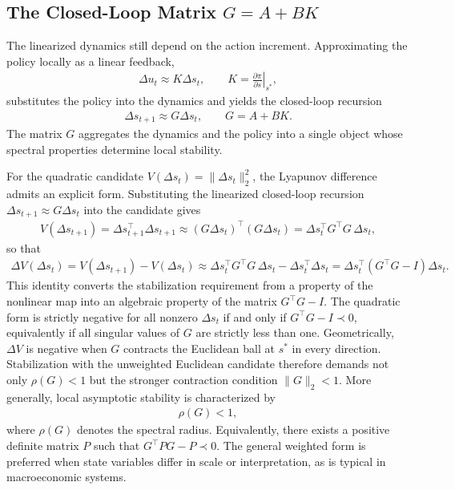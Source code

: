 \documentclass[11pt]{article}
\begin{document}
\subsection{The Closed-Loop Matrix $G=A+BK$}
The linearized dynamics still depend on the action increment. Approximating the policy locally as a linear feedback,
\begin{align*}
    \Delta u_t \approx K \Delta s_t,
    \qquad
    K = \left.\frac{\partial \pi}{\partial s}\right|_{s^*},
\end{align*}
substitutes the policy into the dynamics and yields the closed-loop recursion
\begin{align}
    \Delta s_{t+1} \approx G\Delta s_t,
    \qquad
    G = A + BK.
\end{align}
The matrix $G$ aggregates the dynamics and the policy into a single object whose spectral properties determine local stability.

For the quadratic candidate $V(\Delta s_t)=\|\Delta s_t\|_2^2$, the Lyapunov difference admits an explicit form. Substituting the linearized closed-loop recursion $\Delta s_{t+1} \approx G\Delta s_t$ into the candidate gives
\begin{align*}
    V(\Delta s_{t+1}) = \Delta s_{t+1}^\top \Delta s_{t+1}
    \approx (G\Delta s_t)^\top (G\Delta s_t) = \Delta s_t^\top G^\top G\, \Delta s_t,
\end{align*}
so that
\begin{align}
    \Delta V(\Delta s_t)
    = V(\Delta s_{t+1}) - V(\Delta s_t)
    \approx \Delta s_t^\top G^\top G\, \Delta s_t - \Delta s_t^\top \Delta s_t
    = \Delta s_t^\top (G^\top G - I)\Delta s_t.
    \label{eq:dV-quadratic}
\end{align}
This identity converts the stabilization requirement from a property of the nonlinear map into an algebraic property of the matrix $G^\top G - I$. The quadratic form is strictly negative for all nonzero $\Delta s_t$ if and only if $G^\top G - I \prec 0$, equivalently if all singular values of $G$ are strictly less than one. Geometrically, $\Delta V$ is negative when $G$ contracts the Euclidean ball at $s^*$ in every direction. Stabilization with the unweighted Euclidean candidate therefore demands not only $\rho(G) < 1$ but the stronger contraction condition $\|G\|_2 < 1$. More generally, local asymptotic stability is characterized by
\begin{align}
    \rho(G) < 1,
\end{align}
where $\rho(G)$ denotes the spectral radius. Equivalently, there exists a positive definite matrix $P$ such that $G^\top P G - P \prec 0$. The general weighted form is preferred when state variables differ in scale or interpretation, as is typical in macroeconomic systems.
\end{document}
